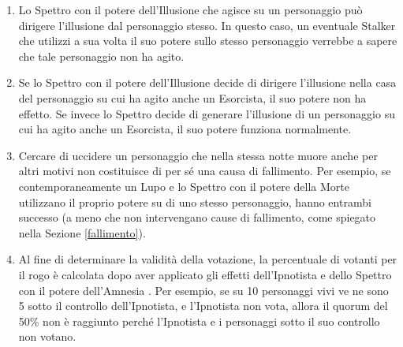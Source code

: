 \documentclass[a4paper,10pt]{article}
\begin{document}
\begin{enumerate}
 
 \item Lo Spettro con il potere dell'Illusione che agisce su un personaggio può
dirigere l'illusione dal personaggio stesso. In questo caso, un eventuale Stalker
che utilizzi a sua volta il suo potere sullo stesso personaggio verrebbe a
sapere che tale personaggio non ha agito.
 
 \item  Se lo Spettro con il potere dell'Illusione decide di dirigere l'illusione 
nella casa del personaggio su cui ha agito anche un Esorcista, il suo potere
non ha effetto.
 Se invece lo Spettro decide di generare l'illusione di un personaggio su cui ha
agito anche un Esorcista, il suo potere funziona normalmente.
 
 \item Cercare di uccidere un personaggio che nella stessa notte muore anche per
altri motivi non costituisce di per sé una causa di fallimento.
 Per esempio, se contemporaneamente un Lupo e lo Spettro con il potere della
Morte utilizzano il proprio potere su di uno stesso personaggio, hanno entrambi
successo (a meno che non intervengano cause di fallimento, come spiegato nella
Sezione \ref{fallimento}).
 
 \item Al fine di determinare la validità della votazione, la percentuale di
 votanti per il rogo è calcolata dopo aver applicato gli effetti dell'Ipnotista
 e dello Spettro con il potere dell'Amnesia
 .
 Per esempio, se su 10 personaggi vivi ve ne sono 5 sotto il controllo dell'Ipnotista,
 e l'Ipnotista non vota, allora il quorum del 50\% non è raggiunto perché l'Ipnotista
 e i personaggi sotto il suo controllo non votano.


\end{enumerate}
\end{document}
